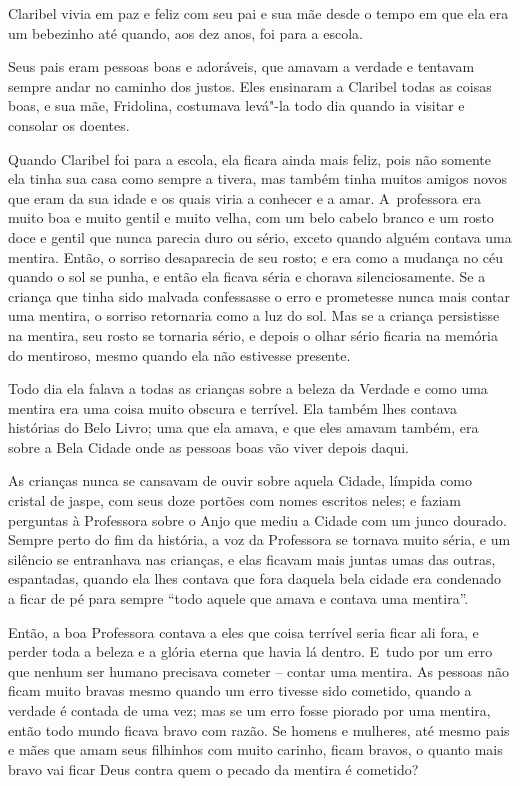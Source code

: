  

Claribel vivia em paz e feliz com seu pai e sua mãe desde o tempo em que
ela era um bebezinho até quando, aos dez anos, foi para a escola.

Seus pais eram pessoas boas e adoráveis, que amavam a verdade e tentavam
sempre andar no caminho dos justos. Eles ensinaram a Claribel todas as
coisas boas, e sua mãe, Fridolina, costumava levá"-la todo dia quando ia
visitar e consolar os doentes.

Quando Claribel foi para a escola, ela ficara ainda mais feliz, pois não
somente ela tinha sua casa como sempre a tivera, mas também tinha muitos
amigos novos que eram da sua idade e os quais viria a conhecer e a amar.
A~professora era muito boa e muito gentil e muito velha, com um belo
cabelo branco e um rosto doce e gentil que nunca parecia duro ou sério,
exceto quando alguém contava uma mentira. Então, o sorriso desaparecia
de seu rosto; e era como a mudança no céu quando o sol se punha, e então
ela ficava séria e chorava silenciosamente. Se a criança que tinha sido
malvada confessasse o erro e prometesse nunca mais contar uma mentira, o
sorriso retornaria como a luz do sol. Mas se a criança persistisse na
mentira, seu rosto se tornaria sério, e depois o olhar sério ficaria na
memória do mentiroso, mesmo quando ela não estivesse presente.

Todo dia ela falava a todas as crianças sobre a beleza da Verdade e como
uma mentira era uma coisa muito obscura e terrível. Ela também lhes
contava histórias do Belo Livro; uma que ela amava, e que eles amavam
também, era sobre a Bela Cidade onde as pessoas boas vão viver depois
daqui.

As crianças nunca se cansavam de ouvir sobre aquela Cidade, límpida como
cristal de jaspe, com seus doze portões com nomes escritos neles; e
faziam perguntas à Professora sobre o Anjo que mediu a Cidade com um
junco dourado. Sempre perto do fim da história, a voz da Professora se
tornava muito séria, e um silêncio se entranhava nas crianças, e elas
ficavam mais juntas umas das outras, espantadas, quando ela lhes contava
que fora daquela bela cidade era condenado a ficar de pé para sempre
``todo aquele que amava e contava uma mentira''.

Então, a boa Professora contava a eles que coisa terrível seria ficar
ali fora, e perder toda a beleza e a glória eterna que havia lá dentro.
E~tudo por um erro que nenhum ser humano precisava cometer -- contar uma
mentira. As pessoas não ficam muito bravas mesmo quando um erro tivesse sido
cometido, quando a verdade é contada de uma vez; mas se um erro fosse
piorado por uma mentira, então todo mundo ficava bravo com razão. Se
homens e mulheres, até mesmo pais e mães que amam seus filhinhos com
muito carinho, ficam bravos, o quanto mais bravo vai ficar Deus contra
quem o pecado da mentira é cometido?

